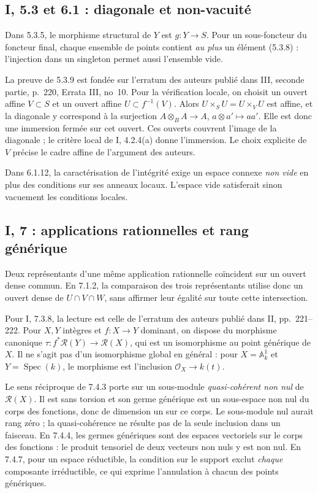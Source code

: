 \documentclass[11pt,a4paper]{article}
\begin{document}
\subsection{I, 5.3 et 6.1 : diagonale et non-vacuité}
\label{note:base1-diagonal}
Dans 5.3.5, le morphisme structural de $Y$ est $g:Y\to S$.
Pour un sous-foncteur du foncteur final, chaque ensemble de points
contient \emph{au plus} un élément (5.3.8) : l'injection dans un
singleton permet aussi l'ensemble vide.

La preuve de 5.3.9 est fondée sur l'erratum des auteurs publié dans
III, seconde partie, p.~220, Errata III, no~10.
Pour la vérification locale, on choisit un ouvert affine $V\subset S$
et un ouvert affine $U\subset f^{-1}(V)$. Alors
$U\times_S U=U\times_V U$ est affine, et la diagonale y correspond
à la surjection $A\otimes_B A\to A$, $a\otimes a'\mapsto aa'$.
Elle est donc une immersion fermée sur cet ouvert. Ces ouverts
couvrent l'image de la diagonale ; le critère local de I, 4.2.4(a)
donne l'immersion. Le choix explicite de $V$ précise le cadre affine
de l'argument des auteurs.

Dans 6.1.12, la caractérisation de l'intégrité exige un espace
connexe \emph{non vide} en plus des conditions sur ses anneaux locaux.
L'espace vide satisferait sinon vacuement les conditions locales.

\subsection{I, 7 : applications rationnelles et rang générique}
\label{note:base1-rational}
Deux représentants d'une même application rationnelle coïncident
sur un ouvert dense commun. En 7.1.2, la comparaison des trois
représentants utilise donc un ouvert dense de $U\cap V\cap W$,
sans affirmer leur égalité sur toute cette intersection.

Pour I, 7.3.8, la lecture est celle de l'erratum des auteurs publié
dans II, pp.~221--222. Pour $X,Y$ intègres et $f:X\to Y$ dominant,
on dispose du morphisme canonique
$\tau:f^*\mathscr R(Y)\to\mathscr R(X)$, qui est un isomorphisme
au point générique de $X$. Il ne s'agit pas d'un isomorphisme global
en général : pour $X=\mathbb A^1_k$ et $Y=\operatorname{Spec}(k)$,
le morphisme est l'inclusion $\mathcal O_X\to k(t)$.

Le sens réciproque de 7.4.3 porte sur un sous-module
\emph{quasi-cohérent non nul} de $\mathscr R(X)$.
Il est sans torsion et son germe générique est un sous-espace non nul
du corps des fonctions, donc de dimension un sur ce corps.
Le sous-module nul aurait rang zéro ; la quasi-cohérence ne résulte
pas de la seule inclusion dans un faisceau.
En 7.4.4, les germes génériques sont des espaces vectoriels sur
le corps des fonctions : le produit tensoriel de deux vecteurs
non nuls y est non nul. En 7.4.7, pour un espace réductible, la
condition sur le support exclut \emph{chaque} composante irréductible,
ce qui exprime l'annulation à chacun des points génériques.
\end{document}

